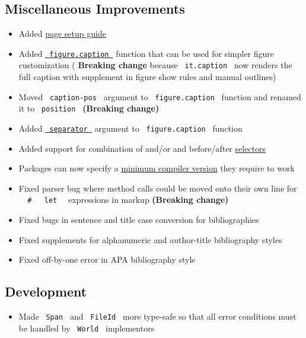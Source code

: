 \subsection{Miscellaneous
Improvements}\label{miscellaneous-improvements}

\begin{itemize}
\tightlist
\item
  Added \href{/docs/guides/page-setup-guide/}{page setup guide}
\item
  Added
  \href{/docs/reference/model/figure/\#definitions-caption}{\texttt{\ figure.caption\ }}
  function that can be used for simpler figure customization (
  \textbf{Breaking change} because \texttt{\ it.caption\ } now renders
  the full caption with supplement in figure show rules and manual
  outlines)
\item
  Moved \texttt{\ caption-pos\ } argument to \texttt{\ figure.caption\ }
  function and renamed it to \texttt{\ position\ } \textbf{(Breaking
  change)}
\item
  Added
  \href{/docs/reference/model/figure/\#definitions-caption-separator}{\texttt{\ separator\ }}
  argument to \texttt{\ figure.caption\ } function
\item
  Added support for combination of and/or and before/after
  \href{/docs/reference/foundations/selector/}{selectors}
\item
  Packages can now specify a
  \href{https://github.com/typst/packages\#package-format}{minimum
  compiler version} they require to work
\item
  Fixed parser bug where method calls could be moved onto their own line
  for
  \texttt{\ }{\texttt{\ \#\ }}\texttt{\ }{\texttt{\ let\ }}\texttt{\ }
  expressions in markup \textbf{(Breaking change)}
\item
  Fixed bugs in sentence and title case conversion for bibliographies
\item
  Fixed supplements for alphanumeric and author-title bibliography
  styles
\item
  Fixed off-by-one error in APA bibliography style
\end{itemize}

\subsection{Development}\label{development}

\begin{itemize}
\tightlist
\item
  Made \texttt{\ Span\ } and \texttt{\ FileId\ } more type-safe so that
  all error conditions must be handled by \texttt{\ World\ }
  implementors
\end{itemize}

